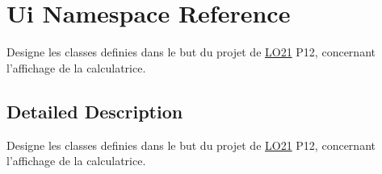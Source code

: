 \hypertarget{namespace_ui}{\section{\-Ui \-Namespace \-Reference}
\label{namespace_ui}
}


\-Designe les classes definies dans le but du projet de \hyperlink{namespace_l_o21}{\-L\-O21} \-P12, concernant l'affichage de la calculatrice.  




\subsection{\-Detailed \-Description}
\-Designe les classes definies dans le but du projet de \hyperlink{namespace_l_o21}{\-L\-O21} \-P12, concernant l'affichage de la calculatrice. 